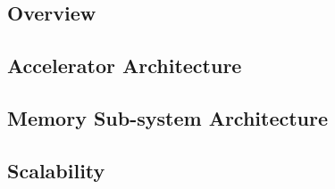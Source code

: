 \subsection{Overview}
\label{sec:overview}


\subsection{Accelerator Architecture}
\label{sec:processing}


\subsection{Memory Sub-system Architecture}
\label{sec:memory}


\subsection{Scalability}
\label{sec:scale}


